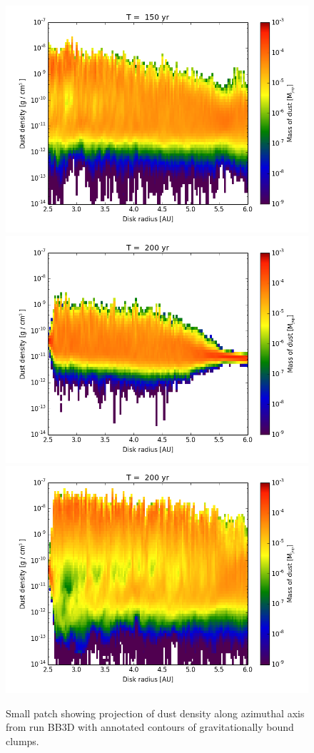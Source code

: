 \begin{figure}
  \includegraphics[width=0.4\linewidth]{figures/hist2d_sg_03.png} \\
  \includegraphics[width=0.4\linewidth]{figures/hist2d_nosg_04.png}
  \includegraphics[width=0.4\linewidth]{figures/hist2d_sg_04.png} 
  \caption{
     Small patch showing projection of dust density along azimuthal axis from
     run BB3D with annotated contours of gravitationally bound clumps.}
  \label{fig6} 
\end{figure}
